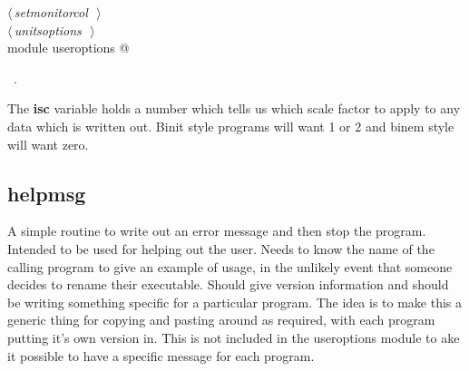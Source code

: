 \documentclass[10pt,a4paper,notitlepage]{article}
\newcommand{\var}[1]{\textbf{\textsf{#1}}} %
\begin{document}
\begin{flushleft}
\begin{minipage}{\linewidth}
\begin{list}{}{}
\mbox{}\verb@@\hbox{$\langle\,${\it setmonitorcol}\nobreak\ {\footnotesize {}}$\,\rangle$}\verb@@\\
\mbox{}\verb@@\hbox{$\langle\,${\it unitsoptions}\nobreak\ {\footnotesize {}}$\,\rangle$}\verb@@\\
\mbox{}\verb@end module useroptions                                            @{\NWsep}
\end{list}
\vspace{-1.5ex}
\footnotesize
\begin{list}{}{\setlength{\itemsep}{-\parsep}\setlength{\itemindent}{-\leftmargin}}
\item \NWtxtMacroRefIn\ .

\item{}
\end{list}
\end{minipage}\vspace{4ex}
\end{flushleft}
The \var{isc} variable holds a number which tells us which scale factor to
apply to any data which is written out. Binit style programs will want 1 or
2 and binem style will want zero. 


\subsection{helpmsg}

A simple routine to write out an error message and then stop the program. 
Intended to be used for helping out the user. Needs to know the name of the
calling program to give an example of usage, in the unlikely event that someone
decides to rename their executable. Should give version information and should
be writing something specific for a particular program. 
The idea is to make this a generic thing for copying and pasting around as 
required, with each program putting it's own version in.
This is not included in the useroptions module to ake it possible to have
a specific message for each program.
\end{document}
